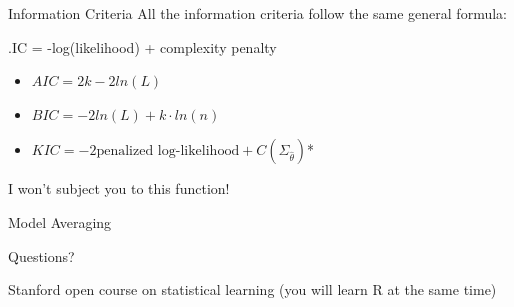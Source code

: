 \documentclass{beamer}\usepackage[]{graphicx}\usepackage[]{color}
\begin{document}
\begin{frame}{Information Criteria}
All the information criteria follow the same general formula:\\
\bigskip
\begin{center}
.IC = -log(likelihood) + complexity penalty\\
\end{center}
\bigskip
\begin{itemize}
\item $AIC= 2k - 2ln(L)$
\item $BIC= -2ln(L) + k \cdot ln(n)$
\item $KIC = -2 \text{penalized log-likelihood} + C\left(\hat{\Sigma}_{\hat{\theta}}\right)$*
\end{itemize}
{\tiny *I won't subject you to this function!}
\end{frame}

\begin{frame}{Model Averaging}

\end{frame}

\begin{frame}{Questions?}


Stanford open course on statistical learning (you will learn R at the same time)

\end{frame}
\end{document}
